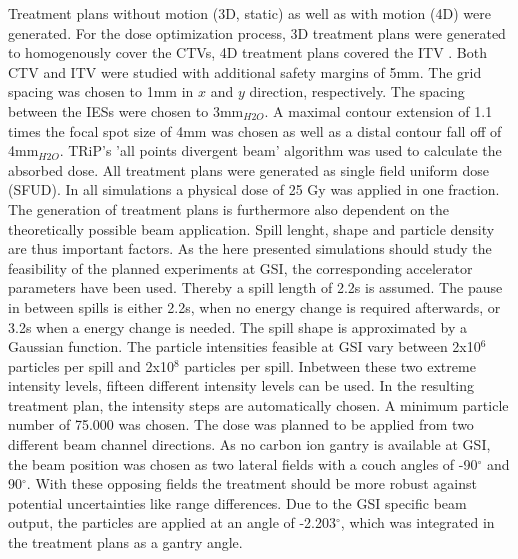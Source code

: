 \documentclass[type=dr, dr=rernat, accentcolor=tud7b,colorbacktitle, bigchapter, openright, twoside, 12pt ]{tudthesis}
\begin{document}
Treatment plans without motion (3D, static) as well as with motion (4D) were generated. 
For the dose optimization process, 3D treatment plans were generated to homogenously cover the CTVs, 4D treatment plans covered the ITV 
\cite{Gra12}. Both CTV and ITV were studied with additional safety margins of 5mm. The grid spacing was chosen to 1$\mathrm{mm}$ in $x$ 
and $y$ direction, respectively. The spacing between the IESs were chosen to 3mm$_{H2O}$. A maximal contour extension of 1.1 times the focal 
spot size of 4mm was chosen as well as a distal contour fall off of 4mm$_{H2O}$. TRiP's 'all points divergent beam' algorithm was used to 
calculate the absorbed dose. All treatment plans were generated as single field uniform dose (SFUD). In all simulations a physical dose of 
25 Gy was applied in one fraction.\newline
\newline
The generation of treatment plans is furthermore also dependent on the theoretically possible 
beam application. Spill lenght, shape and particle density are thus important factors. As the here presented simulations should 
study the feasibility of the planned experiments at GSI, the corresponding accelerator 
parameters have been used. Thereby a spill length of 2.2s is assumed. The pause in between spills is either 2.2s, when no energy change is 
required afterwards, or 3.2s when a energy change is needed. The spill shape is approximated by a Gaussian function. The particle intensities 
feasible at GSI vary between 2x10$^{6}$ particles per spill and 2x10$^{8}$ particles per spill. Inbetween these two extreme intensity levels, 
fifteen different intensity levels can be used. In the resulting treatment plan, the intensity steps are automatically chosen.
A minimum particle number of 75.000 was chosen.\newline
\newline
The dose was planned to be applied from two different beam channel directions. As no carbon ion gantry is available at GSI, the beam position 
was chosen as two lateral fields with a couch angles of -90$^{\circ}$ and 90$^{\circ}$. With these opposing fields the treatment should be 
more robust against potential uncertainties like range differences. Due to the GSI specific beam output, the particles are applied at an 
angle of -2.203$^{\circ}$, which was integrated in the treatment plans as a gantry angle.\newline
\newline
\end{document}
